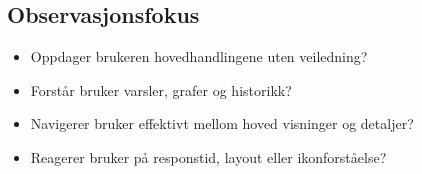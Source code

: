 \subsection*{Observasjonsfokus}
\begin{itemize}[nosep]
  \item Oppdager brukeren hovedhandlingene uten veiledning?  
  \item Forstår bruker varsler, grafer og historikk?  
  \item Navigerer bruker effektivt mellom hoved visninger og detaljer?  
  \item Reagerer bruker på responstid, layout eller ikonforståelse?  
\end{itemize}
